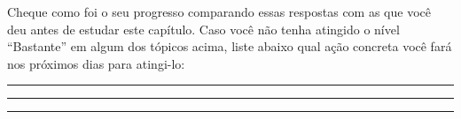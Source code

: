 \documentclass[main.tex]{subfiles}
\begin{document}
Cheque como foi o seu progresso comparando essas respostas com as que você deu antes de estudar este capítulo. Caso você não tenha atingido o nível ``Bastante''  em algum dos tópicos acima, liste abaixo qual ação concreta você fará nos próximos dias para atingi-lo:

\vspace{0.3cm}

\noindent\rule{\linewidth}{0.4pt}

\noindent\rule{\linewidth}{0.4pt}

\noindent\rule{\linewidth}{0.4pt}

\paraAmbos
\end{document}

